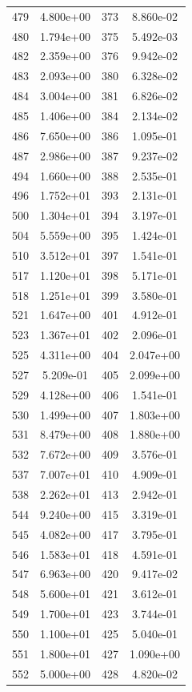 \documentclass[12pt]{article}
\begin{document}
\begin{longtable}{@{}cccc@{}}
479 & 4.800e+00 & 373 & 8.860e-02 \\
480 & 1.794e+00 & 375 & 5.492e-03 \\
482 & 2.359e+00 & 376 & 9.942e-02 \\
483 & 2.093e+00 & 380 & 6.328e-02 \\
484 & 3.004e+00 & 381 & 6.826e-02 \\
485 & 1.406e+00 & 384 & 2.134e-02 \\
486 & 7.650e+00 & 386 & 1.095e-01 \\
487 & 2.986e+00 & 387 & 9.237e-02 \\
494 & 1.660e+00 & 388 & 2.535e-01 \\
496 & 1.752e+01 & 393 & 2.131e-01 \\
500 & 1.304e+01 & 394 & 3.197e-01 \\
504 & 5.559e+00 & 395 & 1.424e-01 \\
510 & 3.512e+01 & 397 & 1.541e-01 \\
517 & 1.120e+01 & 398 & 5.171e-01 \\
518 & 1.251e+01 & 399 & 3.580e-01 \\
521 & 1.647e+00 & 401 & 4.912e-01 \\
523 & 1.367e+01 & 402 & 2.096e-01 \\
525 & 4.311e+00 & 404 & 2.047e+00 \\
527 & 5.209e-01 & 405 & 2.099e+00 \\
529 & 4.128e+00 & 406 & 1.541e-01 \\
530 & 1.499e+00 & 407 & 1.803e+00 \\
531 & 8.479e+00 & 408 & 1.880e+00 \\
532 & 7.672e+00 & 409 & 3.576e-01 \\
537 & 7.007e+01 & 410 & 4.909e-01 \\
538 & 2.262e+01 & 413 & 2.942e-01 \\
544 & 9.240e+00 & 415 & 3.319e-01 \\
545 & 4.082e+00 & 417 & 3.795e-01 \\
546 & 1.583e+01 & 418 & 4.591e-01 \\
547 & 6.963e+00 & 420 & 9.417e-02 \\
548 & 5.600e+01 & 421 & 3.612e-01 \\
549 & 1.700e+01 & 423 & 3.744e-01 \\
550 & 1.100e+01 & 425 & 5.040e-01 \\
551 & 1.800e+01 & 427 & 1.090e+00 \\
552 & 5.000e+00 & 428 & 4.820e-02 \\

\end{longtable}
\end{document}
